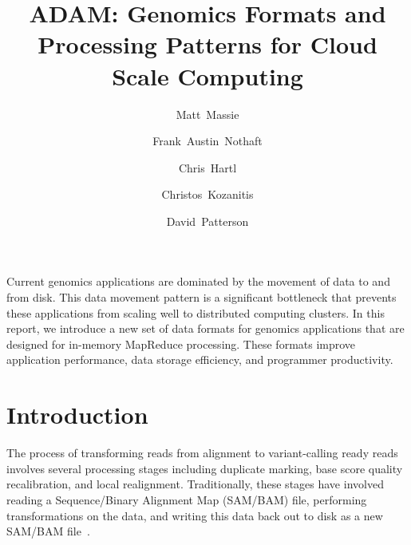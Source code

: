 \documentclass[11pt,twocolumn]{article}
\date{}
\begin{document}
\title{ADAM: Genomics Formats and Processing Patterns for Cloud Scale Computing}
\author[1]{Matt~Massie}
\author[1]{Frank~Austin~Nothaft}
\author[2]{Chris~Hartl}
\author[1]{Christos~Kozanitis}
\author[1]{David~Patterson}

\maketitle

\abstract

Current genomics applications are dominated by the movement of data to and from disk. This data movement pattern
is a significant bottleneck that prevents these applications from scaling well to distributed computing clusters. In this report,
we introduce a new set of data formats for genomics applications that are designed for in-memory MapReduce processing.
These formats improve application performance, data storage efficiency, and programmer productivity.

\section{Introduction}
\label{sec:introduction}

The process of transforming reads from alignment to variant-calling ready reads involves several processing stages including
duplicate marking, base score quality recalibration, and local realignment. Traditionally, these stages have involved reading
a Sequence/Binary Alignment Map (SAM/BAM) file, performing transformations on the data, and writing this data back out to
disk as a new SAM/BAM file~\cite{li09}.




\end{document}
